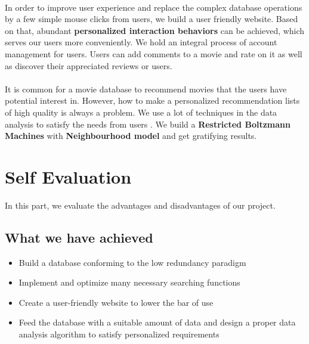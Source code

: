 \begin{CJK*}{UTF8}{gbsn}
\paragraph{} In order to improve user experience and replace the complex database operations by a few simple mouse clicks from users, we build a user friendly website. Based on that, abundant \textbf{personalized interaction behaviors} can be achieved, which serves our users more conveniently. We hold an integral process of account management for users. Users can add comments to a movie and rate on it as well as discover their appreciated reviews or users.
\paragraph{} It is common for a movie database to recommend movies that the users have potential interest in. However,  how to make a personalized recommendation lists of high quality is always a problem. We use a lot of techniques in the data analysis to satisfy the needs from users . We build a \textbf{Restricted Boltzmann Machines}  with \textbf{Neighbourhood model} and get gratifying results.
\section{Self Evaluation}
In this part, we evaluate the advantages and disadvantages of our project.
\subsection{What we have achieved}
\begin{itemize}
\item Build a database conforming to the low redundancy paradigm
\item Implement and optimize many necessary  searching functions
\item Create a user-friendly website to lower the bar of use
\item Feed the database with a suitable amount of data and design a proper data analysis algorithm to satisfy personalized requirements
\end{itemize}

\end{CJK*}
